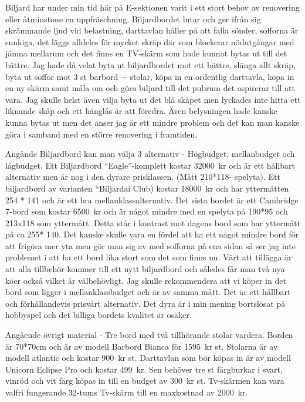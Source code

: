 \documentclass[../_main/handlingar.tex]{subfiles}
\begin{document}

Biljard har under min tid här på E-sektionen varit i ett stort behov av renovering eller
åtminstone en uppfräschning. Biljardbordet lutar och ger ifrån sig skrämmande ljud vid
belastning, darttavlan håller på att falla sönder, sofforna är sunkiga, det läggs alldeles för
mycket skräp där som blockerar nödutgångar med jämna mellarum och det finns en
TV-skärm som hade kunnat bytas ut till det bättre. Jag hade då velat byta ut biljardbordet
mot ett bättre, slänga allt skräp, byta ut soffor mot 3 st barbord + stolar, köpa in en ordentlig
darttavla, köpa in en ny skärm samt måla om och göra biljard till det pubrum det aspirerar till
att vara. Jag skulle helst även vilja byta ut det blå skåpet men lyckades inte hitta ett liknande
skåp och ett hänglås är att föredra. Även belysningen hade kanske kunna bytas ut men det
anser jag är ett mindre problem och det kan man kanske göra i samband med en större
renovering i framtiden.

Angånde Biljardbord kan man välja 3 alternativ - Högbudget, mellanbudget och lågbudget.
Ett Biljardbord “Eagle”-komplett kostar \SI{32000}{kr} och är ett hållbart alternativ men är nog i
den dyrare prisklassen. (Mått 210*118- spelyta). Ett biljardbord av varianten “Biljardai Club)
kostar \SI{18000}{kr} och har yttermåtten 254 * 141 och är ett bra mellanklassalternativ. Det sista
bordet är ett Cambridge 7-bord som kostar \SI{6500}{kr} och är något mindre med en spelyta på
190*95 och 213x118 som yttermått. Detta står i kontrast mot dagens bord som har yttermått
på ca 255* 140. Det kanske skulle vara en fördel att ha ett något mindre bord för att frigöra
mer yta men gör man sig av med sofforna på ena sidan så ser jag inte problemet i att ha ett
bord lika stort som det som finns nu. Värt att tillägga är att alla tillbehör kommer till ett nytt
biljardbord och således får man två nya köer också vilket är välbehövligt. Jag skulle
rekommendera att vi köper in det bord som ligger i mellanklassbudget och är av samma
mått. Det är ett hållbart och förhållandevis prisvärt alternativ. Det dyra är i min mening
bortslösat på hobbyspel och det billiga bordets kvalitet är osäker.

Angående övrigt material - Tre bord med två tillhörande stolar vardera. Borden är 70*70cm
och är av modell Barbord Bianca för \SI{1595}{kr} st. Stolarna är av modell atlantic och kostar
\SI{900}{kr} st. Darttavlan som bör köpas in är av modell Unicorn Eclipse Pro och kostar \SI{499}{kr}.
Sen behöver tre st färgburkar i svart, vinröd och vit färg köpas in till en budget av \SI{300}{kr} st.
Tv-skärmen kan vara valfri fungerande 32-tums Tv-skärm till en maxkostnad av \SI{2000}{kr}.
\end{document}
